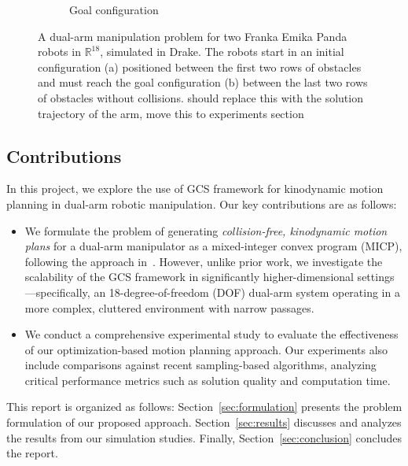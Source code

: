 \begin{figure}[!t]
\begin{subfigure}[b]{0.19\textwidth}
        \captionsetup{justification=centering}
        \caption{Goal configuration}
        \label{subfig:cage_goal_orbit}
    \end{subfigure}
    \caption{A dual-arm manipulation problem for two Franka Emika Panda robots in {\color{red}$\mathbb{R}^{18}$}, simulated in Drake. The robots start in an initial configuration (a) positioned between the first two rows of obstacles and must reach the goal configuration (b) between the last two rows of obstacles without collisions. {\color{red}should replace this with the solution trajectory of the arm, move this to experiments section}}
    \label{fig:simulation}
\end{figure}

\subsection{Contributions}
In this project, we explore the use of GCS framework for kinodynamic motion planning in dual-arm robotic manipulation. Our key contributions are as follows:

\begin{itemize}
\item We formulate the problem of generating \textit{collision-free, kinodynamic motion plans} for a dual-arm manipulator as a mixed-integer convex program (MICP), following the approach in~\cite{marcucci2023motion}. However, unlike prior work, we investigate the scalability of the GCS framework in significantly higher-dimensional settings---specifically, an 18-degree-of-freedom (DOF) dual-arm system operating in a more complex, cluttered environment with narrow passages.
 
\item We conduct a comprehensive experimental study to evaluate the effectiveness of our optimization-based motion planning approach. Our experiments also include comparisons against recent sampling-based algorithms, analyzing critical performance metrics such as solution quality and computation time.
\end{itemize} 

This report is organized as follows: Section~\ref{sec:formulation} presents the problem formulation of our proposed approach. Section~\ref{sec:results} discusses and analyzes the results from our simulation studies. Finally, Section~\ref{sec:conclusion} concludes the report.